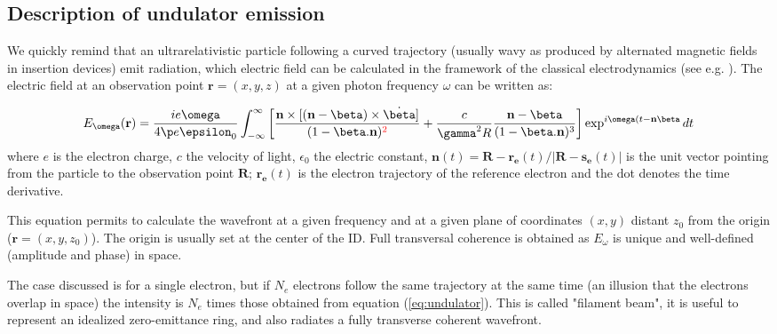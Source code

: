 \documentclass{iucr}              %
\newcommand{\inred}[1]{{\color{red}#1}}
\begin{document}
\subsection{Description of undulator emission}
\label{sec:undulator}

We quickly remind that an ultrarelativistic particle following a curved trajectory (usually wavy as produced by alternated magnetic fields in insertion devices) emit radiation, which electric field can be calculated in the framework of the classical electrodynamics (see e.g. \cite{jackson}). The electric field at an observation point $\textbf{r}=(x,y,z)$ at a given photon frequency $\omega$ can be written as: 

\begin{equation}
\label{eq:undulator}
    E_{\omega}(\textbf{r}) = \frac{i e \omega}{4 \p e \epsilon_0} 
    \int_{-\infty}^{\infty}
    \left[ 
    \frac{
    \textbf{n} \times [(\textbf{n} - \mathbf{\beta}) \times \dot{\mathbf{\beta}}]
    }
    {
    (1- \mathbf{\beta} . \textbf{n})^\inred{2}
    } +  
    \frac{c}{\gamma^2 R}   \frac{\textbf{n} - \mathbf{\beta}}{(1-\mathbf{\beta} . \textbf{n})^3} 
    \right] \exp^{i \omega (t - \textbf{n}\mathbf{\beta}} dt
\end{equation}
where $e$ is the electron charge, $c$ the velocity of light, $\epsilon_0$ the electric constant,
$\textbf{n}(t)=\textbf{R}-\textbf{r}_{\textbf{e}}(t)/|\textbf{R}-\textbf{s}_{\textbf{e}}(t)|$ is the unit vector
pointing from the particle to the observation point $\textbf{R}$; $\textbf{r}_{\textbf{e}}(t)$ is the
electron trajectory of the reference electron and the dot denotes the time derivative.

This equation permits to calculate the wavefront at a given frequency and at a given plane of coordinates $(x,y)$ distant $z_0$ from the origin ($\textbf{r}=(x,y,z_0)$). The origin is usually set at the center of the ID. Full transversal coherence is obtained as $E_{\omega}$ is unique and well-defined (amplitude and phase) in space.

The case discussed is for a single electron, but if $N_e$ electrons follow the same trajectory at the same time (an illusion that the electrons overlap in space) the intensity is $N_e$ times those obtained from equation (\ref{eq:undulator}). This is called "filament beam", it is useful to represent an idealized zero-emittance ring, and also radiates a fully transverse coherent wavefront.
\end{document}
